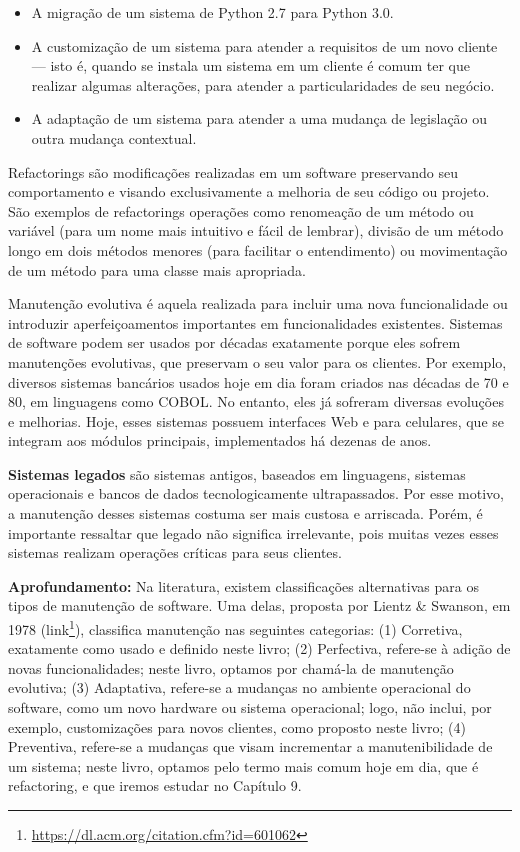 \documentclass[
  11pt,
  twoside]{book}
\DeclareRobustCommand{\href}[2]{#2\footnote{\url{#1}}}
\newenvironment{esmbox}{\centering \vspace{1.5ex} \begin{tcolorbox}[breakable, colback=backcolor, width=4.9in]}{\end{tcolorbox} \vspace{1.5ex}}
\begin{document}
\begin{itemize}
\item
  A migração de um sistema de Python 2.7 para Python 3.0.
\item
  A customização de um sistema para atender a requisitos de um novo
  cliente --- isto é, quando se instala um sistema em um cliente é comum
  ter que realizar algumas alterações, para atender a particularidades
  de seu negócio.
\item
  A adaptação de um sistema para atender a uma mudança de legislação ou
  outra mudança contextual.
\end{itemize}

Refactorings são modificações realizadas em um software preservando seu
comportamento e visando exclusivamente a melhoria de seu código ou
projeto. São exemplos de refactorings operações como renomeação de um
método ou variável (para um nome mais intuitivo e fácil de lembrar),
divisão de um método longo em dois métodos menores (para facilitar o
entendimento) ou movimentação de um método para uma classe mais
apropriada.

 Manutenção evolutiva é aquela
realizada para incluir uma nova funcionalidade ou introduzir
aperfeiçoamentos importantes em funcionalidades existentes. Sistemas de
software podem ser usados por décadas exatamente porque eles sofrem
manutenções evolutivas, que preservam o seu valor para os clientes. Por
exemplo, diversos sistemas bancários usados hoje em dia foram criados
nas décadas de 70 e 80, em linguagens como COBOL. No entanto, eles já
sofreram diversas evoluções e melhorias. Hoje, esses sistemas possuem
interfaces Web e para celulares, que se integram aos módulos principais,
implementados há dezenas de anos.

 \textbf{Sistemas legados} são sistemas antigos,
baseados em linguagens, sistemas operacionais e bancos de dados
tecnologicamente ultrapassados. Por esse motivo, a manutenção desses
sistemas costuma ser mais custosa e arriscada. Porém, é importante
ressaltar que legado não significa irrelevante, pois muitas vezes esses
sistemas realizam operações críticas para seus clientes.

\begin{esmbox}

\textbf{Aprofundamento:} Na literatura, existem classificações
alternativas para os tipos de manutenção de software. Uma delas,
proposta por Lientz \& Swanson, em 1978
(\href{https://dl.acm.org/citation.cfm?id=601062}{link}), classifica
manutenção nas seguintes categorias: (1) Corretiva, exatamente como
usado e definido neste livro; (2) Perfectiva, refere-se à adição de
novas funcionalidades; neste livro, optamos por chamá-la de manutenção
evolutiva; (3) Adaptativa, refere-se a mudanças no ambiente operacional
do software, como um novo hardware ou sistema operacional; logo, não
inclui, por exemplo, customizações para novos clientes, como proposto
neste livro; (4) Preventiva, refere-se a mudanças que visam incrementar
a manutenibilidade de um sistema; neste livro, optamos pelo termo mais
comum hoje em dia, que é refactoring, e que iremos estudar no Capítulo
9.

\end{esmbox}
\end{document}
